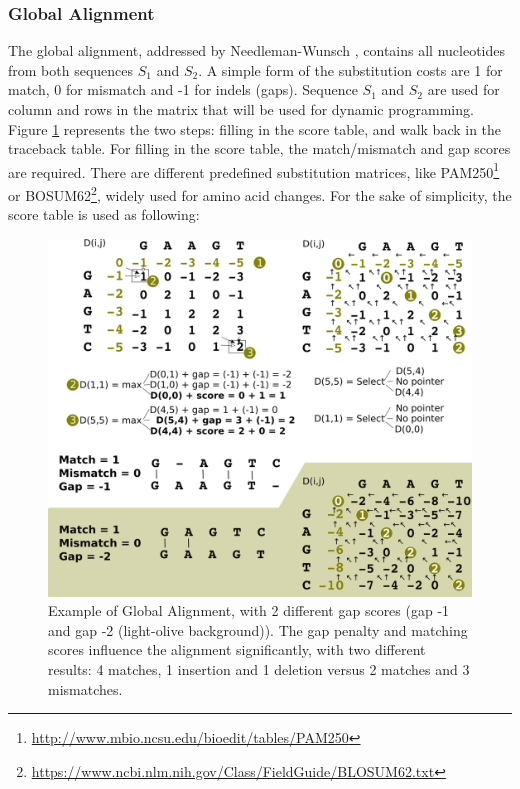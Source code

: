 \subsubsection{Global Alignment}
The global alignment, addressed by Needleman-Wunsch \cite{Needleman1970}, contains all nucleotides from both sequences $S_1$ and $S_2$. A simple form of the substitution costs are 1 for match, 0 for mismatch and -1 for indels (gaps). Sequence $S_1$ and $S_2$ are used for column and rows in the matrix that will be used for dynamic programming. Figure \ref{fig:global} represents the two steps: filling in the score table, and walk back in the traceback table. For filling in the score table, the match/mismatch and gap scores are required. There are different predefined substitution matrices, like PAM250\footnote{\url{http://www.mbio.ncsu.edu/bioedit/tables/PAM250}} or BOSUM62\footnote{\url{https://www.ncbi.nlm.nih.gov/Class/FieldGuide/BLOSUM62.txt}}, widely used for amino acid changes. For the sake of simplicity, the score table is used 
as following:
\begin{figure}[H]

    \centering
    \includegraphics[width=1\textwidth]{images/globalAlign.png}
    \caption[Example of Global Alignment]{Example of Global Alignment, with 2 different gap scores (gap -1 and gap -2 (light-olive background)). The gap penalty and matching scores influence the alignment significantly, with two different results: 4 matches, 1 insertion and 1 deletion versus 2 matches and 3 mismatches.}
    \label{fig:global}
\end{figure}



